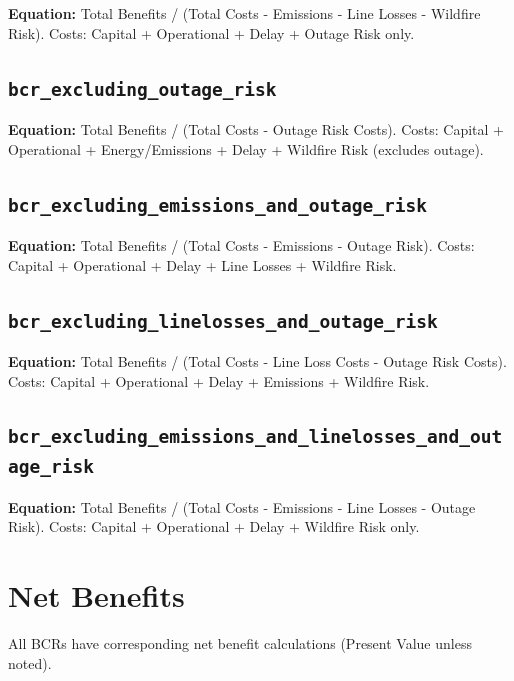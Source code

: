 \documentclass[ctcc_full_documentation.tex]{subfiles}
\begin{document}
\textbf{Equation:} Total Benefits / (Total Costs - Emissions - Line Losses - Wildfire Risk). Costs: Capital + Operational + Delay + Outage Risk only.

\subsection{\texttt{bcr\_excluding\_outage\_risk}}

\textbf{Equation:} Total Benefits / (Total Costs - Outage Risk Costs). Costs: Capital + Operational + Energy/Emissions + Delay + Wildfire Risk (excludes outage).

\subsection{\texttt{bcr\_excluding\_emissions\_and\_outage\_risk}}

\textbf{Equation:} Total Benefits / (Total Costs - Emissions - Outage Risk). Costs: Capital + Operational + Delay + Line Losses + Wildfire Risk.

\subsection{\texttt{bcr\_excluding\_linelosses\_and\_outage\_risk}}

\textbf{Equation:} Total Benefits / (Total Costs - Line Loss Costs - Outage Risk Costs). Costs: Capital + Operational + Delay + Emissions + Wildfire Risk.

\subsection{\texttt{bcr\_excluding\_emissions\_and\_linelosses\_and\_outage\_risk}}

\textbf{Equation:} Total Benefits / (Total Costs - Emissions - Line Losses - Outage Risk). Costs: Capital + Operational + Delay + Wildfire Risk only.

\section{Net Benefits}

All BCRs have corresponding net benefit calculations (Present Value unless noted).
\end{document}
